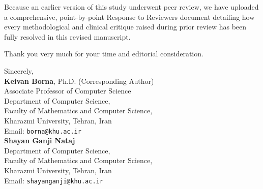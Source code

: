 \documentclass[11pt]{article}
\begin{document}
\vspace{0.6em}
Because an earlier version of this study underwent peer review, we have uploaded a comprehensive, point-by-point Response to Reviewers document detailing how every methodological and clinical critique raised during prior review has been fully resolved in this revised manuscript.

\vspace{0.6em}
Thank you very much for your time and editorial consideration.

\vspace{1.2em}
\noindent
Sincerely,\\
\textbf{Keivan Borna}, Ph.D. (Corresponding Author)\\
Associate Professor of Computer Science\\
Department of Computer Science,\\
Faculty of Mathematics and Computer Science,\\
Kharazmi University, Tehran, Iran\\
Email: \texttt{borna@khu.ac.ir}\\[1.0em]
\textbf{Shayan Ganji Nataj}\\
Department of Computer Science,\\
Faculty of Mathematics and Computer Science,\\
Kharazmi University, Tehran, Iran\\
Email: \texttt{shayanganji@khu.ac.ir}
\end{document}
